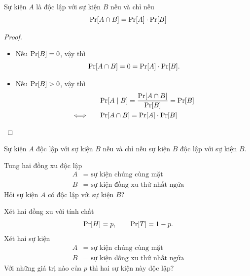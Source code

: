 \begin{frame}
	\begin{thrm}
		Sự kiện $A$ là độc lập với sự kiện $B$ nếu và chỉ nếu 
		\[
			\mathrm{Pr}[A \cap B] = \mathrm{Pr}[A] \cdot \mathrm{Pr}[B]
		\]
	\end{thrm}
	\begin{proof}
		\begin{itemize}
			\item Nếu $\mathrm{Pr}[B] = 0$, vậy thì 
			\[
				\mathrm{Pr}[A\cap B] =  0 = \mathrm{Pr}[A]\cdot \mathrm{Pr}[B].
			\]
			\item Nếu $\mathrm{Pr}[B] > 0$, vậy thì 
			\begin{align*}
				&\mathrm{Pr}[A\mid B] = \frac{\mathrm{Pr}[A\cap B]}{\mathrm{Pr}[B]} = \mathrm{Pr}[B] \\
				\Longleftrightarrow\qquad  &\mathrm{Pr}[A \cap B] = \mathrm{Pr}[A]\cdot \mathrm{Pr}[B] 
			\end{align*} 
		\end{itemize}
		
		\vspace{-0.5cm}
	\end{proof}
\end{frame}

\begin{frame}
	\begin{crllr}
		Sự kiện $A$ độc lập với sự kiện $B$ nếu và chỉ nếu sự kiện $B$ độc lập với sự kiện $B$.
	\end{crllr}
\end{frame}

\begin{frame}
	\begin{qstn}
		Tung hai đồng xu độc lập 
		\begin{align*}
			A &= \text{ sự kiện chúng cùng mặt}\\ 
			B &= \text{ sự kiện đồng xu thứ nhất ngửa}
		\end{align*}
		Hỏi sự kiện $A$ có độc lập với sự kiện $B$? 
	\end{qstn}
\end{frame}

\begin{frame}
	\begin{qstn}
		Xét hai đồng xu với tính chất 
		\[
			\mathrm{Pr}[H] = p, \qquad \mathrm{Pr}[T] = 1 - p.
		\]
		Xét hai sự kiện
		\begin{align*}
			A &= \text{ sự kiện chúng cùng mặt}\\ 
			B &= \text{ sự kiện đồng xu thứ nhất ngửa}
		\end{align*}
		Với những giá trị nào của $p$ thì hai sự kiện này độc lập?
	\end{qstn}
\end{frame}

